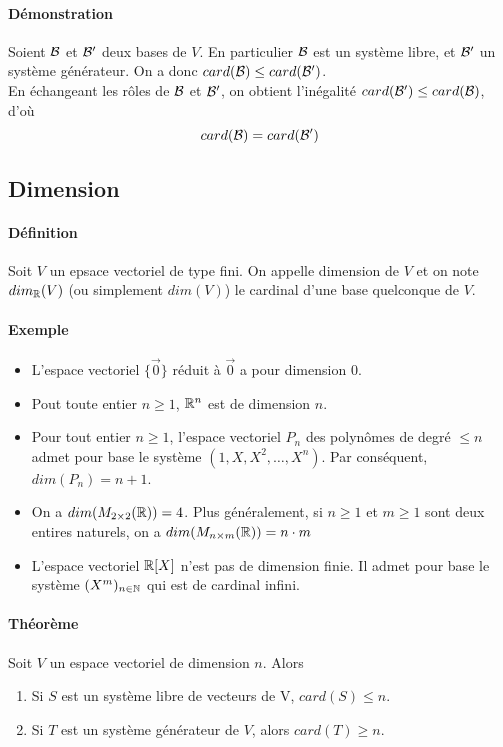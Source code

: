 \paragraph{Démonstration} Soient $\mathcal{B}$ et $\mathcal{B}'$ deux bases de $V$. En particulier $\mathcal{B}$ est un système libre, et $\mathcal{B}'$ un système générateur. On a donc $card(\mathcal{B}) \leq card(\mathcal{B}')$. \\
En échangeant les rôles de $\mathcal{B}$ et $\mathcal{B}'$, on obtient l'inégalité $card(\mathcal{B}') \leq card(\mathcal{B})$, d'où 
$$card(\mathcal{B}) = card(\mathcal{B}')$$

%
\subsection{Dimension}
%
\paragraph{Définition} Soit $V$ un epsace vectoriel de type fini. On appelle dimension de $V$ et on note $dim_{\mathbb{R}}(V)$ (ou simplement $dim(V)$) le cardinal d'une base quelconque de $V$.
\paragraph{Exemple}
\begin{itemize}
  \item L'espace vectoriel $\{ \vec{0} \}$ réduit à $\vec{0}$ a pour dimension $0$.
  \item Pout toute entier $n \geq 1$, $\mathbb{R}^n$ est de dimension $n$.
  \item Pour tout entier $n \geq 1$, l'espace vectoriel $P_n$ des polynômes de degré $\leq n$ admet pour base le système $(1, X, X^2, \ldots, X^n)$. Par conséquent, $dim(P_n) = n+1$.
  \item On a $dim(M_{2\times 2}(\mathbb{R}) ) = 4$. Plus généralement, si $n \geq 1$ et $m \geq 1$ sont deux entires naturels, on a $dim( M_{n\times m}(\mathbb{R}) ) = n\cdot m$
  \item L'espace vectoriel $\mathbb{R}[X]$ n'est pas de dimension finie. Il admet pour base le système $(X^m)_{n \in \mathbb{N}}$ qui est de cardinal infini. %
\end{itemize}

\paragraph{Théorème} Soit $V$ un espace vectoriel de dimension $n$. Alors 
\begin{enumerate}
  \item Si $S$ est un système libre de vecteurs de V,  $card(S) \leq n$.
  \item Si $T$ est un système générateur de $V$, alors $card(T) \geq n$.
\end{enumerate}

